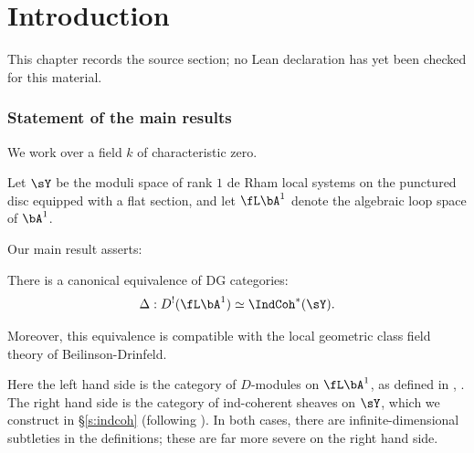 \chapter{Introduction}
\label{tates-thesis-de-rham-setting-chapter-01}

\begin{remark}
\label{tates-thesis-de-rham-setting-chapter-01-source}
This chapter records the source section; no Lean declaration has yet been checked for this material.
\notready
\end{remark}

\label{s:intro}

\subsection{Statement of the main results}

We work over a field $k$ of characteristic zero.

Let $\sY$ be the moduli space of rank $1$ de Rham local systems on
the punctured disc equipped with a flat section, and
let $\fL \bA^1$ denote the algebraic loop space of $\bA^1$.

Our main result asserts:

\begin{thm}
\notready\label{t:main}

There is a canonical equivalence of DG categories:
%
\[
\Delta:D^!(\fL \bA^1) \simeq \IndCoh^*(\sY).
\]

Moreover, this equivalence is compatible with the local geometric
class field theory of Beilinson-Drinfeld.

\end{thm}

Here the left hand side is the category of $D$-modules on $\fL \bA^1$,
as defined in \cite{dario}, \cite{dmod}. The right hand side
is the category of ind-coherent sheaves on $\sY$, which we construct
in \S \ref{s:indcoh} (following \cite{methods}). In both cases,
there are infinite-dimensional subtleties in the definitions;
these are far more severe on the right hand side.

